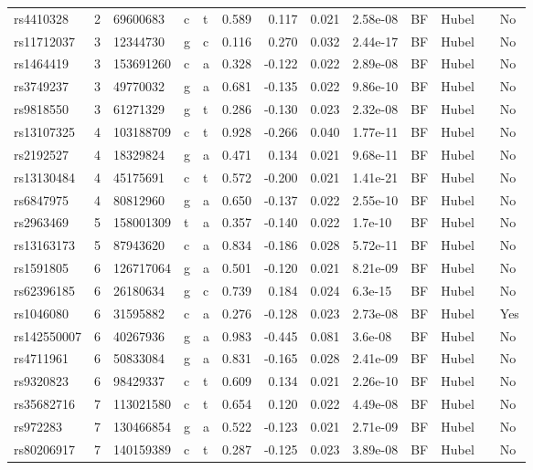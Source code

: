 \documentclass[11pt,twoside]{bristolthesis}
\begin{document}
\begin{longtable}[t]{lrlllrrrlllll}
rs4410328 & 2 & 69600683 & c & t & 0.589 & 0.117 & 0.021 & 2.58e-08 & BF & Hubel &  & No\\
rs11712037 & 3 & 12344730 & g & c & 0.116 & 0.270 & 0.032 & 2.44e-17 & BF & Hubel &  & No\\
rs1464419 & 3 & 153691260 & c & a & 0.328 & -0.122 & 0.022 & 2.89e-08 & BF & Hubel &  & No\\
\addlinespace
rs3749237 & 3 & 49770032 & g & a & 0.681 & -0.135 & 0.022 & 9.86e-10 & BF & Hubel &  & No\\
rs9818550 & 3 & 61271329 & g & t & 0.286 & -0.130 & 0.023 & 2.32e-08 & BF & Hubel &  & No\\
rs13107325 & 4 & 103188709 & c & t & 0.928 & -0.266 & 0.040 & 1.77e-11 & BF & Hubel &  & No\\
rs2192527 & 4 & 18329824 & g & a & 0.471 & 0.134 & 0.021 & 9.68e-11 & BF & Hubel &  & No\\
rs13130484 & 4 & 45175691 & c & t & 0.572 & -0.200 & 0.021 & 1.41e-21 & BF & Hubel &  & No\\
\addlinespace
rs6847975 & 4 & 80812960 & g & a & 0.650 & -0.137 & 0.022 & 2.55e-10 & BF & Hubel &  & No\\
rs2963469 & 5 & 158001309 & t & a & 0.357 & -0.140 & 0.022 & 1.7e-10 & BF & Hubel &  & No\\
rs13163173 & 5 & 87943620 & c & a & 0.834 & -0.186 & 0.028 & 5.72e-11 & BF & Hubel &  & No\\
rs1591805 & 6 & 126717064 & g & a & 0.501 & -0.120 & 0.021 & 8.21e-09 & BF & Hubel &  & No\\
rs62396185 & 6 & 26180634 & g & c & 0.739 & 0.184 & 0.024 & 6.3e-15 & BF & Hubel &  & No\\
\addlinespace
rs1046080 & 6 & 31595882 & c & a & 0.276 & -0.128 & 0.023 & 2.73e-08 & BF & Hubel &  & Yes\\
rs142550007 & 6 & 40267936 & g & a & 0.983 & -0.445 & 0.081 & 3.6e-08 & BF & Hubel &  & No\\
rs4711961 & 6 & 50833084 & g & a & 0.831 & -0.165 & 0.028 & 2.41e-09 & BF & Hubel &  & No\\
rs9320823 & 6 & 98429337 & c & t & 0.609 & 0.134 & 0.021 & 2.26e-10 & BF & Hubel &  & No\\
rs35682716 & 7 & 113021580 & c & t & 0.654 & 0.120 & 0.022 & 4.49e-08 & BF & Hubel &  & No\\
\addlinespace
rs972283 & 7 & 130466854 & g & a & 0.522 & -0.123 & 0.021 & 2.71e-09 & BF & Hubel &  & No\\
rs80206917 & 7 & 140159389 & c & t & 0.287 & -0.125 & 0.023 & 3.89e-08 & BF & Hubel &  & No\\

\end{longtable}
\end{document}
